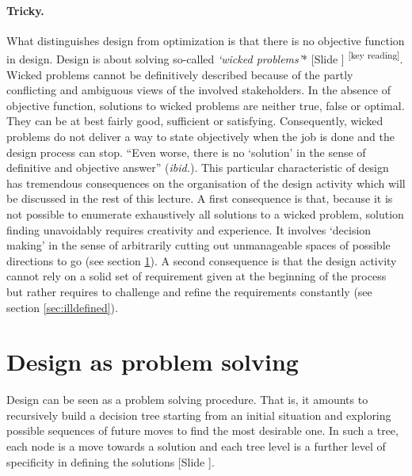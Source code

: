 \documentclass{article}
\newcounter{slide}
\begin{document}
\paragraph{Tricky.} What distinguishes design from optimization is that there is no objective function in design. Design is about solving so-called \emph{`wicked problems'}* {\color{blue}[Slide ]} \cite{rittelDilemmasGeneralTheory1973}\textsuperscript{\color{Magenta}[key reading]}. Wicked problems cannot be definitively described because of the partly conflicting and ambiguous views of the involved stakeholders. In the absence of objective function, solutions to wicked problems are neither true, false or optimal. They can be at best fairly good, sufficient or satisfying. Consequently, wicked problems do not deliver a way to state objectively when the job is done and the design process can stop. ``Even worse, there is no `solution' in the sense of definitive and objective answer'' (\emph{ibid.}). This particular characteristic of design has tremendous consequences on the organisation of the design activity which will be discussed in the rest of this lecture. A first consequence is that, because it is not possible to enumerate exhaustively all solutions to a wicked problem, solution finding unavoidably requires creativity and experience. It involves `decision making' in the sense of arbitrarily cutting out unmanageable spaces of possible directions to go (see section \ref{sec:GeneralProblemSolving}). A second consequence is that the design activity cannot rely on a solid set of requirement given at the beginning of the process but rather requires to challenge and refine the requirements constantly (see section \ref{sec:illdefined}). 

\section{Design as problem solving}
\label{sec:GeneralProblemSolving}
Design can be seen as a problem solving procedure. That is, it amounts to recursively build a decision tree starting from an initial situation and exploring possible sequences of future moves to find the most desirable one. In such a tree, each node is a move towards a solution and each tree level is a further level of specificity in defining the solutions {\color{blue}[Slide ]}. 
\end{document}
